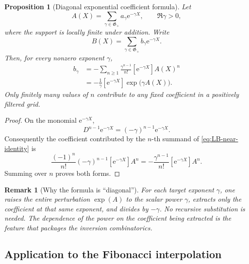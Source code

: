 \documentclass[11pt,oneside]{article}
\numberwithin{equation}{section}
\newtheorem{proposition}[theorem]{Proposition}
\newtheorem{remark}[theorem]{Remark}
\newcommand{\e}{\mathrm{e}}
\newcommand{\coeff}[2]{[#1]#2}
\begin{document}
\begin{proposition}[Diagonal exponential coefficient formula]
\label{prop:diagonal-formula}
Let
\begin{equation}
  A(X)=\sum_{\gamma\in\mathfrak G_+}a_\gamma\e^{-\gamma X},
  \qquad \Re\gamma>0,
  \label{eq:A-exponential-grid}
\end{equation}
where the support is locally finite under addition.  Write
\begin{equation}
  B(X)=\sum_{\gamma\in\mathfrak G_+}b_\gamma\e^{-\gamma X}.
\end{equation}
Then, for every nonzero exponent \(\gamma\),
\begin{align}
  b_\gamma
  &=-\sum_{n\ge1}\frac{\gamma^{n-1}}{n!}
      \coeff{\e^{-\gamma X}}{A(X)^n}
  \label{eq:b-convolution}\\
  &=-\frac1\gamma\coeff{\e^{-\gamma X}}
      {\exp\!\bigl(\gamma A(X)\bigr)}.
  \label{eq:b-diagonal}
\end{align}
Only finitely many values of \(n\) contribute to any fixed coefficient in a
positively filtered grid.
\end{proposition}

\begin{proof}
On the monomial \(\e^{-\gamma X}\),
\begin{equation}
  D^{n-1}\e^{-\gamma X}=(-\gamma)^{n-1}\e^{-\gamma X}.
\end{equation}
Consequently the coefficient contributed by the \(n\)-th summand of
\cref{eq:LB-near-identity} is
\begin{equation}
  \frac{(-1)^n}{n!}(-\gamma)^{n-1}
  \coeff{\e^{-\gamma X}}{A^n}
  =-\frac{\gamma^{n-1}}{n!}
  \coeff{\e^{-\gamma X}}{A^n}.
\end{equation}
Summing over \(n\) proves both forms.
\end{proof}

\begin{remark}[Why the formula is ``diagonal'']
For each target exponent \(\gamma\), one raises the entire perturbation
\(\exp(A)\) to the scalar power \(\gamma\), extracts only the coefficient at
that same exponent, and divides by \(-\gamma\).  No recursive substitution is
needed.  The dependence of the power on the coefficient being extracted is the
feature that packages the inversion combinatorics.
\end{remark}

\subsection{Application to the Fibonacci interpolation}
\end{document}
